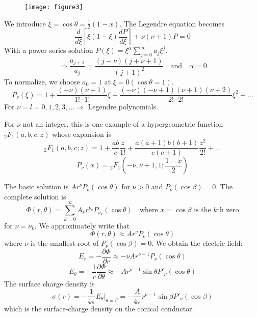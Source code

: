 \documentclass{article}
\begin{document}
	\begin{figure}[h]
		\centering
		\texttt{[image: figure3]}
		\caption{}
		\label{fig:figure3}
	\end{figure}

	
	We introduce $\xi = \cos\theta = \frac{1}{2}(1-x)$. The Legendre equation becomes
	\begin{equation}
		\frac{d}{d\xi}\left[ \xi(1-\xi) \frac{dP}{d\xi} \right] + \nu(\nu+1)P = 0
	\end{equation}
	With a power series solution $P(\xi) = \xi^\alpha \sum_{j=0}^{\infty} a_j \xi^j$.
	\begin{equation}
		\Rightarrow \frac{a_{j+1}}{a_j} = \frac{(j-\nu)(j+\nu+1)}{(j+1)^2} \quad \text{and} \quad \alpha = 0
	\end{equation}
	To normalize, we choose $a_0=1$ at $\xi=0 (\cos\theta=1)$.
	\begin{equation}
		P_\nu(\xi) = 1 + \frac{(-\nu)(\nu+1)}{1! \cdot 1!} \xi + \frac{(-\nu)(-\nu+1)(\nu+1)(\nu+2)}{2! \cdot 2!} \xi^2 + \dots
	\end{equation}
	For $\nu = l = 0, 1, 2, 3, \dots \Rightarrow$ Legendre polynomials.
	
	For $\nu$ not an integer, this is one example of a hypergeometric function $_2F_1(a,b,c;z)$ whose expansion is
	\begin{equation}
		_2F_1(a,b,c;z) = 1 + \frac{ab}{c}\frac{z}{1!} + \frac{a(a+1)b(b+1)}{c(c+1)}\frac{z^2}{2!} + \dots
	\end{equation}
	\begin{equation}
		P_\nu(x) = {}_2F_1\left(-\nu, \nu+1, 1; \frac{1-x}{2}\right)
	\end{equation}
	
	The basic solution is $A r^\nu P_\nu(\cos\theta)$ for $\nu > 0$ and $P_\nu(\cos\beta)=0$.
	The complete solution is
	\begin{equation}
		\Phi(r, \theta) = \sum_{k=0}^{\infty} A_k r^{\nu_k} P_{\nu_k}(\cos\theta) \quad \text{where } x=\cos\beta \text{ is the } k\text{th zero}
	\end{equation}
	for $\nu=\nu_k$.
	We approximately write that
	\begin{equation}
		\Phi(r,\theta) \approx A r^\nu P_\nu(\cos\theta)
	\end{equation}
	where $\nu$ is the smallest root of $P_\nu(\cos\beta)=0$.
	We obtain the electric field:
	\begin{equation}
		E_r = -\frac{\partial\Phi}{\partial r} \approx -\nu A r^{\nu-1} P_\nu(\cos\theta)
	\end{equation}
	\begin{equation}
		E_\theta = -\frac{1}{r}\frac{\partial\Phi}{\partial\theta} \approx -A r^{\nu-1} \sin\theta P'_\nu(\cos\theta)
	\end{equation}
	The surface charge density is
	\begin{equation}
		\sigma(r) = -\frac{1}{4\pi} E_\theta \rvert_{\theta=\beta} = -\frac{A}{4\pi} r^{\nu-1} \sin\beta P'_\nu(\cos\beta)
	\end{equation}
	which is the surface-charge density on the conical conductor.
	
\end{document}
